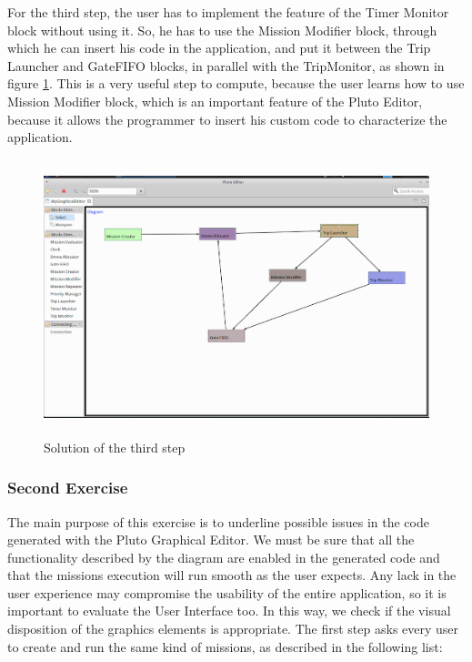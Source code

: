 \newpage

For the third step, the user has to implement the feature of the Timer Monitor block without using it.
So, he has to use the Mission Modifier block, through which he can insert his code in the application, and put it between the Trip Launcher and GateFIFO blocks, in parallel with the TripMonitor, as shown in figure \ref{fig:thirdStep}.
This is a very useful step to compute, because the user learns how to use Mission Modifier block, which is an important feature of the Pluto Editor, because it allows the programmer to insert his custom code to characterize the application.

\begin{figure}[H]
  \centering
  \includegraphics[width=\linewidth, height=8cm]{pictures/thirdStep.png}
  \caption{Solution of the third step}
  \label{fig:thirdStep}
\end{figure}

\subsubsection{Second Exercise}

The main purpose of this exercise is to underline possible issues in the code generated with the Pluto Graphical Editor. We must be sure that all the functionality described by the diagram are enabled in the generated code and that the missions execution will run smooth as the user expects. Any lack in the user experience may compromise the usability of the entire application, so it is important to evaluate the User Interface too. In this way, we check if the visual disposition of the graphics elements is appropriate.
The first step asks every user to create and run the same kind of missions, as described in the following list:

